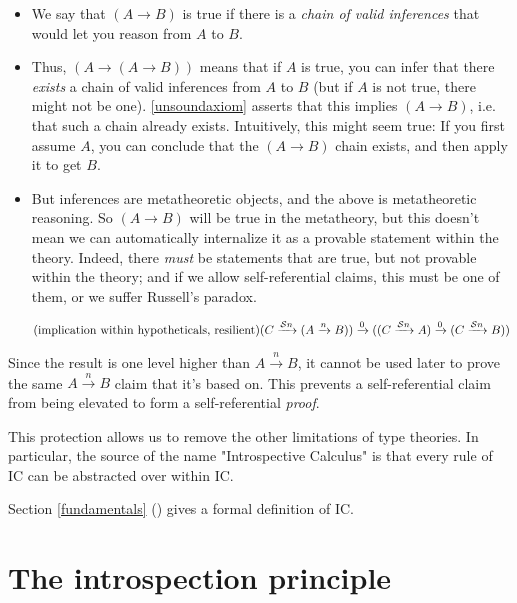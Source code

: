 \documentclass{article}
\begin{document}
  \begin{itemize}
    \item We say that $(A \to B)$ is true if there is a \emph{chain of valid inferences} that would let you reason from $A$ to $B$.
    \item Thus, $(A \to (A \to B))$ means that if $A$ is true, you can infer that there \emph{exists} a chain of valid inferences from $A$ to $B$ (but if $A$ is not true, there might not be one). \eqref{unsoundaxiom} asserts that this implies $(A \to B)$, i.e. that such a chain already exists. Intuitively, this might seem true: If you first assume $A$, you can conclude that the $(A \to B)$ chain exists, and then apply it to get $B$.
    \item But inferences are metatheoretic objects, and the above is metatheoretic reasoning. So $(A \to B)$ will be true in the metatheory, but this doesn't mean we can automatically internalize it as a provable statement within the theory. Indeed, there \emph{must} be statements that are true, but not provable within the theory; and if we allow self-referential claims, this must be one of them, or we suffer Russell's paradox.
  \end{itemize}

  
  
    \renewcommand{\implies}[1]{\xrightarrow{#1}}
  \newcommand{\lzero}{0}
  \newcommand{\lsucc}[1]{\mathcal{S} #1}
  \begin{equation*}
    \tag{implication within hypotheticals, resilient}
    (C \implies{\lsucc n} (A \implies{n} B)) \implies{\lzero} ((C \implies{\lsucc n} A) \implies{\lzero} (C \implies{\lsucc n} B))
    \vspace{0.8em}
  \end{equation*}
  
  Since the result is one level higher than $A \implies{n} B$, it cannot be used later to prove the same $A \implies{n} B$ claim that it's based on. This prevents a self-referential claim from being elevated to form a self-referential \emph{proof}.
  
  This protection allows us to remove the other limitations of type theories.
  In particular, the source of the name "Introspective Calculus" is that every rule of IC can be abstracted over within IC.
  
  Section \ref{fundamentals} (\textit{}) gives a formal definition of IC.
  
  \fi
   
  \section{The introspection principle}\label{firststeps}
  
\end{document}
